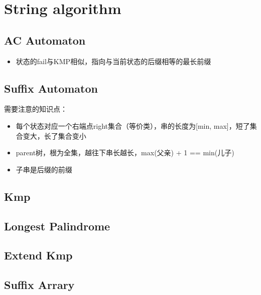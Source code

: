 \section{String algorithm}
	\subsection{AC Automaton}
		\begin{itemize}
			\item 状态的fail与KMP相似，指向与当前状态的后缀相等的最长前缀
		\end{itemize}
		
	\subsection{Suffix Automaton}
		\begin{flushleft}
			需要注意的知识点：
			\begin{itemize}
				\item 每个状态对应一个右端点right集合（等价类），串的长度为[min, max]，短了集合变大，长了集合变小
				\item parent树，根为全集，越往下串长越长，max(父亲) + 1 == min(儿子)
				\item 子串是后缀的前缀
			\end{itemize}
		\end{flushleft}
		
	\subsection{Kmp}
		
	\subsection{Longest Palindrome}
		
	\subsection{Extend Kmp}
		
	\subsection{Suffix Arrary}
		

